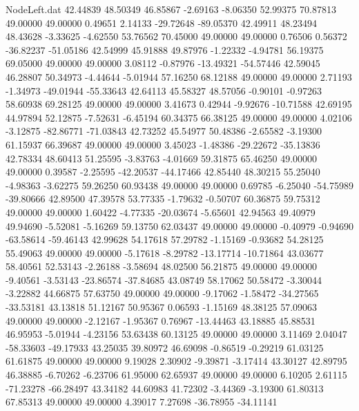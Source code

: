 \begin{filecontents}{NodeLeft.dat}
  42.44839   48.50349   46.85867    -2.69163   -8.06350   52.99375   70.87813   49.00000   49.00000    0.49651    2.14133  -29.72648  -89.05370
  42.49911   48.23494   48.43628    -3.33625   -4.62550   53.76562   70.45000   49.00000   49.00000    0.76506    0.56372  -36.82237  -51.05186
  42.54999   45.91888   49.87976    -1.22332   -4.94781   56.19375   69.05000   49.00000   49.00000    3.08112   -0.87976  -13.49321  -54.57446
  42.59045   46.28807   50.34973    -4.44644   -5.01944   57.16250   68.12188   49.00000   49.00000    2.71193   -1.34973  -49.01944  -55.33643
  42.64113   45.58327   48.57056    -0.90101   -0.97263   58.60938   69.28125   49.00000   49.00000    3.41673    0.42944   -9.92676  -10.71588
  42.69195   44.97894   52.12875    -7.52631   -6.45194   60.34375   66.38125   49.00000   49.00000    4.02106   -3.12875  -82.86771  -71.03843
  42.73252   45.54977   50.48386    -2.65582   -3.19300   61.15937   66.39687   49.00000   49.00000    3.45023   -1.48386  -29.22672  -35.13836
  42.78334   48.60413   51.25595    -3.83763   -4.01669   59.31875   65.46250   49.00000   49.00000    0.39587   -2.25595  -42.20537  -44.17466
  42.85440   48.30215   55.25040    -4.98363   -3.62275   59.26250   60.93438   49.00000   49.00000    0.69785   -6.25040  -54.75989  -39.80666
  42.89500   47.39578   53.77335    -1.79632   -0.50707   60.36875   59.75312   49.00000   49.00000    1.60422   -4.77335  -20.03674   -5.65601
  42.94563   49.40979   49.94690    -5.52081   -5.16269   59.13750   62.03437   49.00000   49.00000   -0.40979   -0.94690  -63.58614  -59.46143
  42.99628   54.17618   57.29782    -1.15169   -0.93682   54.28125   55.49063   49.00000   49.00000   -5.17618   -8.29782  -13.17714  -10.71864
  43.03677   58.40561   52.53143    -2.26188   -3.58694   48.02500   56.21875   49.00000   49.00000   -9.40561   -3.53143  -23.86574  -37.84685
  43.08749   58.17062   50.58472    -3.30044   -3.22882   44.66875   57.63750   49.00000   49.00000   -9.17062   -1.58472  -34.27565  -33.53181
  43.13818   51.12167   50.95367     0.06593   -1.15169   48.38125   57.09063   49.00000   49.00000   -2.12167   -1.95367    0.76967  -13.44463
  43.18885   45.88531   46.95953    -5.01944   -4.23156   53.63438   60.13125   49.00000   49.00000    3.11469    2.04047  -58.33603  -49.17933
  43.25035   39.80972   46.69098    -0.86519   -0.29219   61.03125   61.61875   49.00000   49.00000    9.19028    2.30902   -9.39871   -3.17414
  43.30127   42.89795   46.38885    -6.70262   -6.23706   61.95000   62.65937   49.00000   49.00000    6.10205    2.61115  -71.23278  -66.28497
  43.34182   44.60983   41.72302    -3.44369   -3.19300   61.80313   67.85313   49.00000   49.00000    4.39017    7.27698  -36.78955  -34.11141

\end{filecontents}
